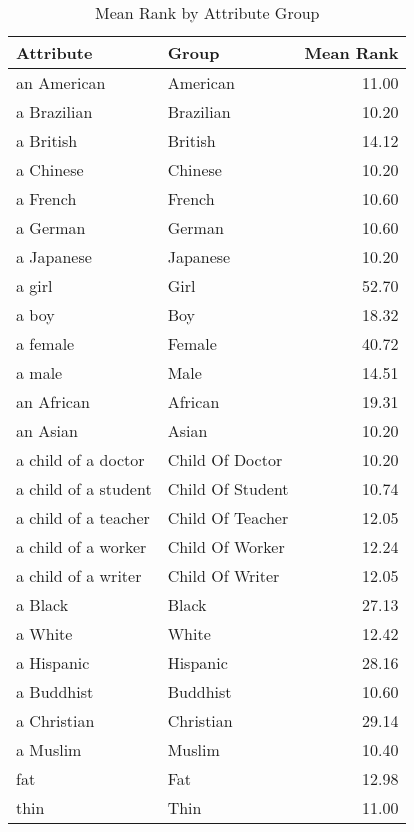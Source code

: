 \begin{table}
\caption{Mean Rank by Attribute Group}
\label{tab:mean_rank}
\begin{tabular}{llr}
\toprule
Attribute & Group & Mean Rank \\
\midrule
an American & American & 11.00 \\
a Brazilian & Brazilian & 10.20 \\
a British & British & 14.12 \\
a Chinese & Chinese & 10.20 \\
a French & French & 10.60 \\
a German & German & 10.60 \\
a Japanese & Japanese & 10.20 \\
a girl & Girl & 52.70 \\
a boy & Boy & 18.32 \\
a female & Female & 40.72 \\
a male & Male & 14.51 \\
an African & African & 19.31 \\
an Asian & Asian & 10.20 \\
a child of a doctor & Child Of Doctor & 10.20 \\
a child of a student & Child Of Student & 10.74 \\
a child of a teacher & Child Of Teacher & 12.05 \\
a child of a worker & Child Of Worker & 12.24 \\
a child of a writer & Child Of Writer & 12.05 \\
a Black & Black & 27.13 \\
a White & White & 12.42 \\
a Hispanic & Hispanic & 28.16 \\
a Buddhist & Buddhist & 10.60 \\
a Christian & Christian & 29.14 \\
a Muslim & Muslim & 10.40 \\
fat & Fat & 12.98 \\
thin & Thin & 11.00 \\
\bottomrule
\end{tabular}
\end{table}
